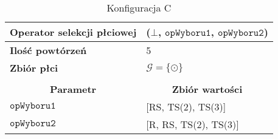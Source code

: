\documentclass[twoside]{iisthesis}
\newcommand{\important}[1]{\mathcal{#1}}
\newcommand{\param}[1]{\mathtt{#1}}
\newcommand{\opName}[1]{\textproc{#1}}
\begin{document}
\begin{table}[h]
	\caption{Konfiguracja C \label{table:tsp_config_compare_c}}
	\begin{tabularx}{\linewidth}{lX}
		\hline
		\multicolumn{1}{|l|}{{\bf Operator selekcji płciowej}}        & \multicolumn{1}{l|}{\opName{stdGenSel}($\bot$, $\param{opWyboru1}$, $\param{opWyboru2}$)} \\ \hline
		\multicolumn{1}{|l|}{{\bf Ilość powtórzeń}} & \multicolumn{1}{l|}{5}                                                                      \\ \hline
		\multicolumn{1}{|l|}{{\bf Zbiór płci}} & \multicolumn{1}{l|}{$\important{G} = \{ \odot \}$} \\  \hline
		&                                                                                             \\ \hline
		\multicolumn{1}{|c|}{{\bf Parametr}}        & \multicolumn{1}{c|}{{\bf Zbiór wartości}}                                                   \\ \hline \hline
		\multicolumn{1}{|l|}{$\param{opWyboru1}$}   & \multicolumn{1}{l|}{[RS, TS(2), TS(3)]}                                                   \\ \hline
		\multicolumn{1}{|l|}{$\param{opWyboru2}$}   & \multicolumn{1}{l|}{[R, RS, TS(2), TS(3)]} \\
		\hline
	\end{tabularx}
\end{table}
\end{document}
